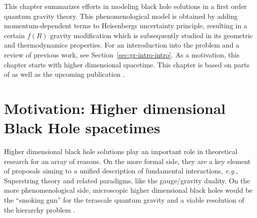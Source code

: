 
\providecommand{\Mbh}{M_{\rm BH}}
\providecommand{\Mpl}{m_\mathrm{Pl}}
\providecommand{\ellp}{\ell_\mathrm{Pl}}
\providecommand{\Mf}{M_d}
\providecommand{\sgn}{\mathrm{sgn}}
\providecommand{\diff}{\mathrm{d}}
\providecommand{\tpi}{(2\pi)}
\providecommand{\dovertwo}{\frac{d}{2}}
\providecommand{\Sin}{%
	\mathop{\sbox0{$\cos$}\makebox[\wd0][r]{$\sin$}}%
}

This chapter summarizes efforts in modeling black hole solutions in a
first order quantum gravity theory. This phenomenological model is 
obtained by adding momentum-dependent terms to Heisenbergs uncertainty
principle, resulting in a certain $f(R)$ gravity modification which is
subsequently studied in its geometric and thermodynamics properties.
For an interoduction into the problem and a review of previous work, see
Section~\vref{sec:gr-intro-intro}.
As a motivation, this chapter starts with higher dimensional spacetime.
This chapter is based on parts of \cite{Koppel:2017rsf} as well as the upcoming
publication \cite{Knipfer2019}.

\section{Motivation: Higher dimensional Black Hole 
spacetimes}\label{sec:motivation-qbh}
Higher dimensional black hole solutions play an important role in theoretical 
research for an array of reasons. On the more formal side, they are a key 
element of proposals aiming to a unified description of fundamental 
interactions, \textit{e.g.}, Superstring theory and related paradigms, like the 
gauge/gravity duality.
On the more phenomenological side, microscopic higher dimensional black holes 
would be the ``smoking  gun'' for the terascale quantum gravity 
\cite{BaF99,DiL01,GiT02}  and a viable resolution of the hierarchy problem 
\cite{AAD98,ADD98,ADD99,RaS99a,RaS99b,ACD01}.

